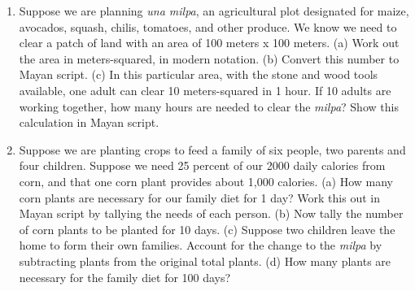 \documentclass[12pt]{article}
\begin{document}
\begin{enumerate}
\item Suppose we are planning \textit{una milpa}, an agricultural plot designated for maize, avocados, squash, chilis, tomatoes, and other produce.  We know we need to clear a patch of land with an area of 100 meters x 100 meters.  (a) Work out the area in meters-squared, in modern notation. (b) Convert this number to Mayan script.  (c) In this particular area, with the stone and wood tools available, one adult can clear 10 meters-squared in 1 hour.  If 10 adults are working together, how many hours are needed to clear the \textit{milpa}?  Show this calculation in Mayan script. \\ \vspace{4cm}
\item Suppose we are planting crops to feed a family of six people, two parents and four children.  Suppose we need 25 percent of our 2000 daily calories from corn, and that one corn plant provides about 1,000 calories. (a) How many corn plants are necessary for our family diet for 1 day?  Work this out in Mayan script by tallying the needs of each person.  (b) Now tally the number of corn plants to be planted for 10 days. (c) Suppose two children leave the home to form their own families.  Account for the change to the \textit{milpa} by subtracting plants from the original total plants.  (d) How many plants are necessary for the family diet for 100 days?
\end{enumerate}
\end{document}
